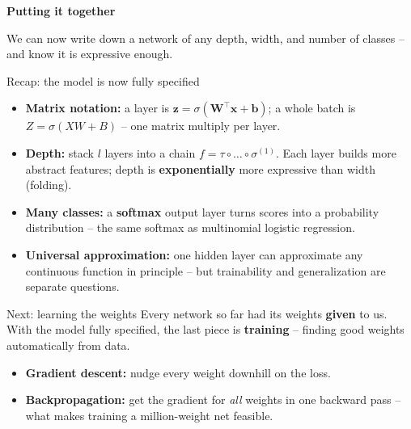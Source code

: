 \documentclass[aspectratio=43]{beamer}
\begin{document}
\begin{frame}[plain]
  \vfill
  \begin{center}
    {\Large\color{popblue}\textbf{Putting it together}}\\[0.9em]
    \begin{minipage}{0.82\textwidth}\centering\small
      We can now write down a network of any depth, width, and number of classes -- and know it
      is expressive enough.
    \end{minipage}
  \end{center}
  \vfill
\end{frame}

\begin{frame}{Recap: the model is now fully specified}
  \begin{itemize}\small
    \item \textbf{Matrix notation:} a layer is $\mathbf{z}=\sigma(\mathbf{W}^\top\mathbf{x}+
      \mathbf{b})$; a whole batch is $Z=\sigma(XW+B)$ -- one matrix multiply per layer.
    \item \textbf{Depth:} stack $l$ layers into a chain
      $f=\tau\circ\ldots\circ\sigma^{(1)}$. Each layer builds more abstract features; depth is
      \textbf{exponentially} more expressive than width (folding).
    \item \textbf{Many classes:} a \textbf{softmax} output layer turns scores into a probability
      distribution -- the same softmax as multinomial logistic regression.
    \item \textbf{Universal approximation:} one hidden layer can approximate any continuous
      function in principle -- but trainability and generalization are separate questions.
  \end{itemize}
  \vfill
\end{frame}

\begin{frame}{Next: learning the weights}
  Every network so far had its weights \textbf{given} to us. With the model fully specified, the
  last piece is \textbf{training} -- finding good weights automatically from data.
  \vfill
  \begin{itemize}\small
    \item \textbf{Gradient descent:} nudge every weight downhill on the loss.
    \item \textbf{Backpropagation:} get the gradient for \emph{all} weights in one backward
      pass -- what makes training a million-weight net feasible.
  \end{itemize}
  \vfill
\end{frame}
\end{document}
